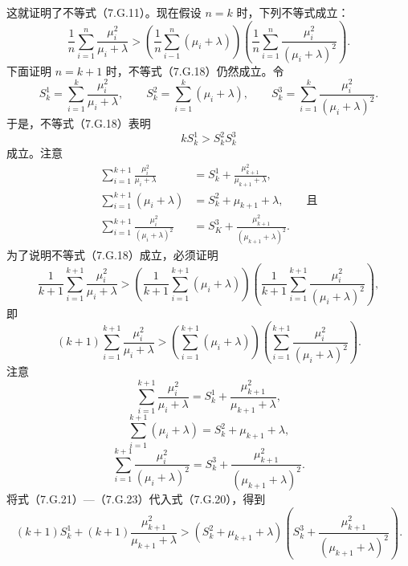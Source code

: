 这就证明了不等式（7.G.11）。现在假设 $n=k$ 时，下列不等式成立：
\begin{equation}
\frac1n\sum_{i=1}^n\frac{\mu_i^2}{\mu_i+\lambda}
 >\left(\frac1n\sum_{i-1}^n(\mu_i+\lambda)\right)
 \left(\frac1n\sum_{i=1}^n\frac{\mu_i^2}{(\mu_i+\lambda)^2}\right).\tag{7.G.18}
\end{equation}
下面证明 $n=k+1$ 时，不等式（7.G.18）仍然成立。令
\[
S_k^1=\sum_{i=1}^k\frac{\mu_i^2}{\mu_i+\lambda},\qquad
S_k^2=\sum_{i=1}^k(\mu_i+\lambda),\qquad
S_k^3=\sum_{i=1}^k\frac{\mu_i^2}{(\mu_i+\lambda)^2}.
\]
于是，不等式（7.G.18）表明
\begin{equation}
kS_k^1>S_k^2S_k^3\tag{7.G.19}
\end{equation}
成立。注意
\[
\begin{aligned}
\sum_{i=1}^{k+1}\frac{\mu_i^2}{\mu_i+\lambda}
 &=S_k^1+\frac{\mu_{k+1}^2}{\mu_{k+1}+\lambda},\\
\sum_{i=1}^{k+1}(\mu_i+\lambda)&=S_k^2+\mu_{k+1}+\lambda,\qquad\text{且}\\
\sum_{i=1}^{k+1}\frac{\mu_i^2}{(\mu_i+\lambda)^2}
 &=S_K^3+\frac{\mu_{k+1}^2}{(\mu_{k+1}+\lambda)^2}.
\end{aligned}
\]
为了说明不等式（7.G.18）成立，必须证明
\[
\frac1{k+1}\sum_{i=1}^{k+1}\frac{\mu_i^2}{\mu_i+\lambda}
 >\left(\frac1{k+1}\sum_{i=1}^{k+1}(\mu_i+\lambda)\right)
 \left(\frac1{k+1}\sum_{i=1}^{k+1}\frac{\mu_i^2}{(\mu_i+\lambda)^2}\right),
\]
即
\begin{equation}
(k+1)\sum_{i=1}^{k+1}\frac{\mu_i^2}{\mu_i+\lambda}
 >\left(\sum_{i=1}^{k+1}(\mu_i+\lambda)\right)
 \left(\sum_{i=1}^{k+1}\frac{\mu_i^2}{(\mu_i+\lambda)^2}\right).\tag{7.G.20}
\end{equation}
注意
\begin{equation}
\sum_{i=1}^{k+1}\frac{\mu_i^2}{\mu_i+\lambda}
 =S_k^1+\frac{\mu_{k+1}^2}{\mu_{k+1}+\lambda},\tag{7.G.21}
\end{equation}
\begin{equation}
\sum_{i=1}^{k+1}(\mu_i+\lambda)=S_k^2+\mu_{k+1}+\lambda,\tag{7.G.22}
\end{equation}
\begin{equation}
\sum_{i=1}^{k+1}\frac{\mu_i^2}{(\mu_i+\lambda)^2}
 =S_k^3+\frac{\mu_{k+1}^2}{(\mu_{k+1}+\lambda)^2}.\tag{7.G.23}
\end{equation}
将式（7.G.21）—（7.G.23）代入式（7.G.20），得到
\begin{equation}
(k+1)S_k^1+(k+1)\frac{\mu_{k+1}^2}{\mu_{k+1}+\lambda}
 >(S_k^2+\mu_{k+1}+\lambda)
 \left(S_k^3+\frac{\mu_{k+1}^2}{(\mu_{k+1}+\lambda)^2}\right).\tag{7.G.24}
\end{equation}
